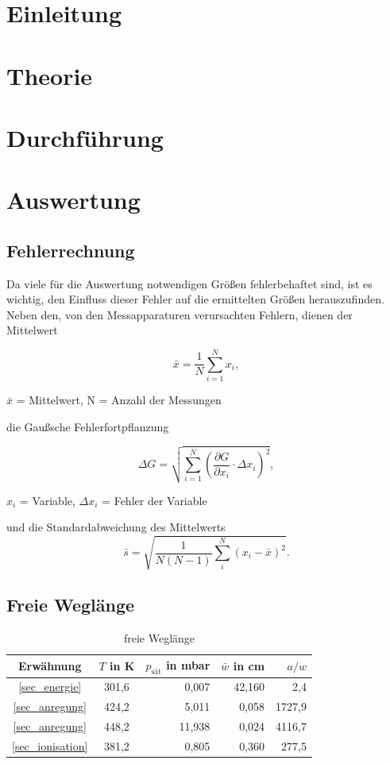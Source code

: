 \section{Einleitung}				%

\section{Theorie}

\section{Durchführung}

\section{Auswertung}
\subsection{Fehlerrechnung}
Da viele für die Auswertung notwendigen Größen fehlerbehaftet sind, ist es wichtig, den Einfluss dieser Fehler auf die ermittelten
Größen herauszufinden. Neben den, von den Messapparaturen verursachten Fehlern, dienen der Mittelwert
\begin{formel}[H]
\begin{equation}
 \bar{x} = \frac1N \sum_{i=1}^{N} x_i,
 \label{eq_mittel}
\end{equation}
\caption*{\small{$\bar{x}$ = Mittelwert, N = Anzahl der Messungen}}
\end{formel}
die Gaußsche Fehlerfortpflanzung
\begin{formel}[H]
\begin{equation}
\Delta G = \sqrt{\sum_{i=1}^{N}\left( \frac{\partial G}{\partial x_i}\cdot \Delta x_i\right)^2},
\label{gauss}
\end{equation}
\caption*{$x_i$ = Variable, $\Delta x_i$ = Fehler der Variable}
\end{formel}
und die Standardabweichung des Mittelwerts
\begin{equation}
 \bar s = \sqrt{\frac{1}{N(N-1)} \sum_{i}^{N} (x_i - \bar{x})^2}.
 \label{eq_standard}
\end{equation}

\subsection{Freie Weglänge}

\begin{table}[H]
 \begin{tabular}{c|c|r|r|r}
  Erwähnung	&$T$ in K	&$p_{\text{sät}}$ in mbar&$\bar w$ in cm	&$a/w$ \\
  \hline
\ref{sec_energie}&	301,6	&0,007&	42,160&	2,4\\
\ref{sec_anregung}&	424,2&	5,011	&0,058&	1727,9\\
\ref{sec_anregung}&	448,2&	11,938&	0,024&	4116,7\\
\ref{sec_ionisation}&	381,2&	0,805&	0,360&	277,5
 \end{tabular}
\caption{freie Weglänge}
\label{tab_weglaenge}
\end{table}

